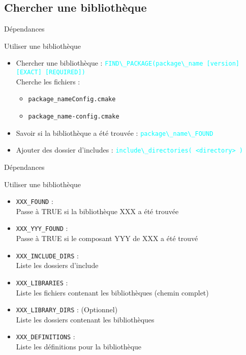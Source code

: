 \documentclass{beamer}
\begin{document}
\subsection{Chercher une bibliothèque}
\begin{frame}[fragile]{Dépendances}
  \begin{block}{Utiliser une bibliothèque}
    \begin{itemize}
    \item Chercher une bibliothèque :\linebreak
      \textcolor{cyan}{\verb?FIND\_PACKAGE(package\_name [version] [EXACT] [REQUIRED])?}\\
      Cherche les fichiers :\\
      \begin{itemize}
      \item \verb?package_nameConfig.cmake ?
      \item \verb?package_name-config.cmake ?
      \end{itemize}
    \item Savoir si la bibliothèque a été trouvée :\linebreak
      \textcolor{cyan}{\verb?package\_name\_FOUND?}
    \item Ajouter des dossier d'includes :\linebreak
      \textcolor{cyan}{\verb?include\_directories( <directory> )?}
    \end{itemize}
  \end{block}
\end{frame}

\begin{frame}[fragile]{Dépendances}
  \begin{block}{Utiliser une bibliothèque}
    \begin{itemize}
    \item \verb?XXX_FOUND? :\\
      Passe à TRUE si la bibliothèque XXX a été trouvée
    \item \verb?XXX_YYY_FOUND? :\\
      Passe à TRUE si le composant YYY de XXX a été trouvé
    \item \verb?XXX_INCLUDE_DIRS? :\\
      Liste les dossiers d'include
    \item \verb?XXX_LIBRARIES? :\\
      Liste les fichiers contenant les bibliothèques (chemin complet)
    \item \verb?XXX_LIBRARY_DIRS? : (Optionnel)\\
      Liste les dossiers contenant les bibliothèques
    \item \verb?XXX_DEFINITIONS? :\\
      Liste les définitions pour la bibliothèque
    \end{itemize}
  \end{block}
\end{frame}
\end{document}
